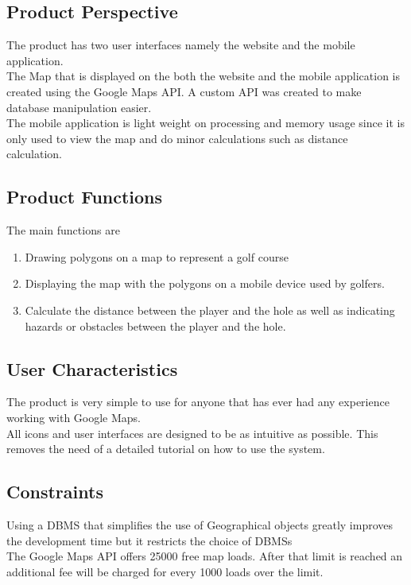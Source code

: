 \documentclass{article}
\begin{document}
    \subsection{Product Perspective}

    The product has two user interfaces namely the website and the mobile
    application.\\ The Map that is displayed on the both the website and the
    mobile application is created using the Google Maps API. A custom API was
    created to make database manipulation easier.\\ The mobile application is
    light weight on processing and memory usage since it is only used to view
    the map and do minor calculations such as distance calculation.

    \subsection{Product Functions}
    The main functions are
    \begin{enumerate}
        \item
            Drawing polygons on a map to represent a golf course
        \item
            Displaying the map with the polygons on a mobile device used by
            golfers.
        \item
            Calculate the distance between the player and the hole as well as
            indicating hazards or  obstacles between the player and the hole.
    \end{enumerate}

    \subsection{User Characteristics}
    The product is very simple to use for anyone that has ever had any
    experience working with Google Maps.\\ All icons and user interfaces are
    designed to be as intuitive as possible. This removes the need of a detailed
    tutorial on how to use the system.

    \subsection{Constraints}
    Using a DBMS that simplifies the use of Geographical objects greatly
    improves the development time but it restricts the choice of DBMSs\\ The
    Google Maps API offers 25000 free map loads. After that limit is reached an
    additional fee will be charged for every 1000 loads over the limit.
\end{document}
